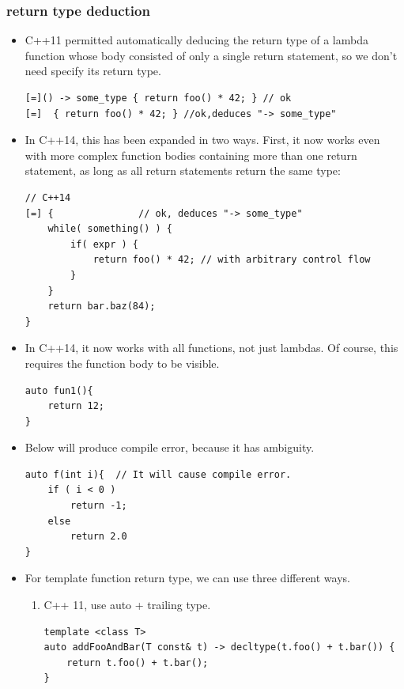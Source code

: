 \documentclass[a4paper,11pt,twoside]{book}
\begin{document}
\subsubsection{return type deduction}
\begin{itemize}
	\item C++11 permitted automatically deducing the return type of a lambda function whose body consisted of only a single return statement, so we don't need specify its return type.
\begin{lstlisting}[numbers=none]
[=]() -> some_type { return foo() * 42; } // ok
[=]  { return foo() * 42; } //ok,deduces "-> some_type"
\end{lstlisting}
	
	\item In C++14, this has been expanded in two ways. First, it now works even with more complex function bodies containing more than one return statement, as long as all return statements return the same type:
\begin{lstlisting}
// C++14
[=] {               // ok, deduces "-> some_type"
	while( something() ) {
		if( expr ) {
			return foo() * 42; // with arbitrary control flow
		}
	}
	return bar.baz(84); 
}                       
\end{lstlisting}
	
	\item In C++14, it now works with all functions, not just lambdas. Of course, this requires the function body to be visible.
\begin{lstlisting}[numbers=none]
auto fun1(){
    return 12;
}
\end{lstlisting}
	
	\item Below will produce compile error, because it has ambiguity.
\begin{lstlisting}[numbers=none]
auto f(int i){  // It will cause compile error.
    if ( i < 0 )
    	return -1;
    else
    	return 2.0
}
\end{lstlisting}

	\item For template function return type, we can use three different ways.
	
	\begin{enumerate}
		\item C++ 11, use auto + trailing type.
\begin{lstlisting}[numbers=none]
template <class T>
auto addFooAndBar(T const& t) -> decltype(t.foo() + t.bar()) {
    return t.foo() + t.bar();
}
\end{lstlisting}


\end{enumerate}
\end{itemize}
\end{document}
